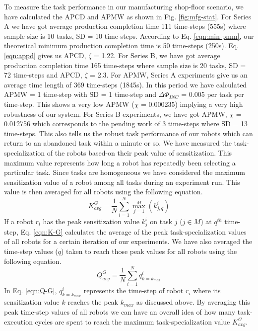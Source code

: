 \documentclass{intech}
\begin{document}
To measure the task performance in our manufacturing shop-floor scenario, we have calculated the APCD and APMW as shown in Fig. \ref{fig:mfg-stat}. For Series A we have got  average production completion time 111 time-steps (555s) where sample size is 10 tasks, SD = 10 time-steps. According to Eq. \ref{eqn:min-pmm}, our theoretical minimum production completion time is 50 time-steps (250s). Eq. \ref{eqn:appd} gives us APCD, $\zeta$ = 1.22. For Series B, we have got average production completion time 165 time-steps where sample size is 20 tasks, SD = 72 time-steps and APCD, $\zeta$ = 2.3. For APMW, Series A experiments give us an average time length of 369 time-steps (1845s).  In this period we have calculated APMW = 1 time-step with SD = 1 time-step and $\Delta \Phi_{INC}$ = 0.005 per task per time-step. This shows a very low APMW ($\chi$ = 0.000235) implying a very high robustness of our system. For Series B experiments, we have got APMW, $\chi$ = 0.012756 which corresponds to the pending work of 3 time-steps where SD = 13 time-steps. This also tells us the robust task performance of our robots which can return to an abandoned task within a minute or so.
We have measured the task-specialization of the robots based-on their peak value of sensitization. This maximum value represents how long a robot has repeatedly been selecting a particular task. Since tasks are homogeneous we have considered the maximum sensitization value of a robot among all tasks during an experiment run. This value is then averaged for all robots using the following  equation. 
\begin{equation}
K^G_{avg} = \frac{1}{N}\sum_{i=1}^{N} \max_{j=1}^M\left ( k^i_{j, q} \right ) 
\label{eqn:K-G}
\end{equation}
If a robot $r_i$ has the peak sensitization value $k^i_j$ on task $j$ ($j \in M$)  at $q^{th}$ time-step, Eq. \ref{eqn:K-G} calculates the average of the peak task-specialization values of all robots for a certain iteration of our experiments. We have also averaged the time-step values ($q$) taken to reach those peak values for all robots using the following equation.
\begin{equation}
Q^G_{avg}= \frac{1}{N}\sum_{i=1}^{N} q^i_{k=k_{max}}
\label{eqn:Q-G}
\end{equation}
In Eq. \ref{eqn:Q-G}, $q^i_{k=k_{max}}$ represents the time-step of robot $r_i$  where its sensitization value $k$ reaches the peak $k_{max}$ as discussed above. By averaging this peak time-step values of all robots we can have an overall idea of how many task-execution cycles are spent to reach the maximum task-specialization value $K^G_{avg}$.
\end{document}
